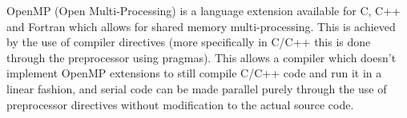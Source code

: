 OpenMP (Open Multi-Processing) is a language extension available for C, C++ and Fortran which allows for shared memory multi-processing. 
This is achieved by the use of compiler directives (more specifically in C/C++ this is done through the preprocessor using pragmas). 
This allows a compiler which doesn't implement OpenMP extensions to still compile C/C++ code
and run it in a linear fashion, and serial code can be made parallel purely through the use of preprocessor
directives without modification to the actual source code.  
